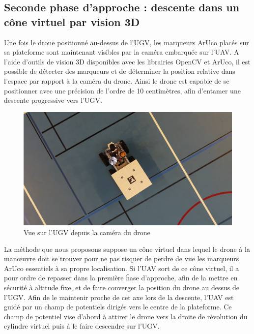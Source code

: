 \subsection{Seconde phase d’approche : descente dans un cône virtuel par vision 3D}

Une fois le drone positionné au-dessus de l’UGV, les marqueurs ArUco placés sur sa plateforme sont maintenant visibles par la caméra embarquée sur l’UAV. A l’aide d’outils de vision 3D disponibles avec les librairies OpenCV et ArUco, il est possible de détecter des marqueurs et de déterminer la position relative dans l’espace par rapport à la caméra du drone. Ainsi le drone est capable de se positionner avec une précision de l’ordre de 10 centimètres, afin d’entamer une descente progressive vers l’UGV.

\begin{figure}[H]
    \centering\includegraphics[width=150mm]{images/phases_approche/ugv_upview.png}
    \caption{Vue sur l'UGV depuis la caméra du drone}
\end{figure}

La méthode que nous proposons suppose un cône virtuel dans lequel le drone à la manœuvre doit se trouver pour ne pas risquer de perdre de vue les marqueurs ArUco essentiels à sa propre localisation. Si l’UAV sort de ce cône virtuel, il a pour ordre de repasser dans la première ĥase d’approche, afin de la mettre en sécurité à altitude fixe, et de faire converger la position du drone au dessus de l’UGV. Afin de le maintenir proche de cet axe lors de la descente, l’UAV est guidé par un champ de potentiels dirigés vers le centre de la plateforme. Ce champ de potentiel vise d’abord à attirer le drone vers la droite de révolution du cylindre virtuel puis à le faire descendre sur l’UGV.


